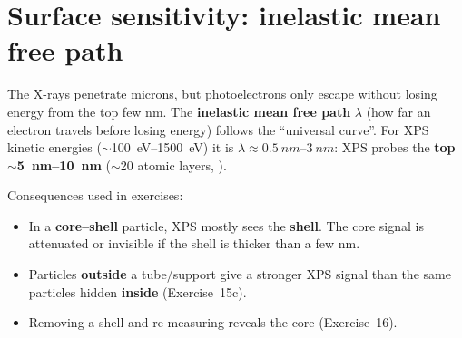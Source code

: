 \section{Surface sensitivity: inelastic mean free path}
\begin{keybox}
The X-rays penetrate microns, but photoelectrons only escape without losing energy from the top few nm. The
\textbf{inelastic mean free path} $\lambda$ (how far an electron travels before losing energy) follows the
``universal curve''. For XPS kinetic energies ($\sim$\SIrange{100}{1500}{eV}) it is $\lambda\approx\SIrange{0.5}{3}{nm}$:
XPS probes the \textbf{top $\sim$\SIrange{5}{10}{nm}} ($\sim$20 atomic layers, ).
\end{keybox}
\begin{tipbox}
Consequences used in exercises:
\begin{itemize}
  \item In a \textbf{core--shell} particle, XPS mostly sees the \textbf{shell}. The core signal is attenuated or invisible
        if the shell is thicker than a few nm.
  \item Particles \textbf{outside} a tube/support give a stronger XPS signal than the same particles hidden
        \textbf{inside} (Exercise~15c).
  \item Removing a shell and re-measuring reveals the core (Exercise~16).
\end{itemize}
\end{tipbox}

